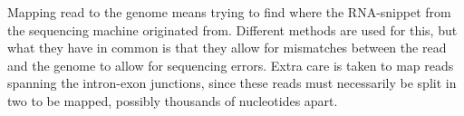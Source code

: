 Mapping read to the genome means trying to find where the RNA-snippet from the
sequencing machine originated from. Different methods are used for this, but
what they have in common is that they allow for mismatches between the read and
the genome to allow for sequencing errors. Extra care is taken to map reads
spanning the intron-exon junctions, since these reads must necessarily be split
in two to be mapped, possibly thousands of nucleotides apart.
